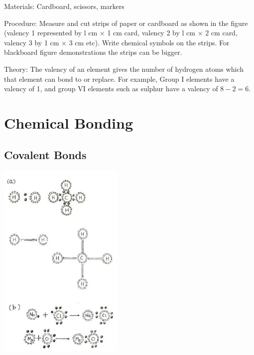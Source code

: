 \begin{multicols}{2}
\begin{description*}
\item[Materials:]{Cardboard, scissors, markers}
\item[Procedure:]{Measure and cut strips of paper or cardboard as shown in the figure (valency 1 represented by
l cm $\times$ 1 cm card, valency 2 by l cm $\times$ 2 cm card,
valency 3 by 1 cm $\times$ 3 cm etc). Write chemical
symbols on the strips. For blackboard figure
demonstrations the strips can be bigger.}
\item[Theory:]{The valency of an element gives the number of
hydrogen atoms which that element can bond to or
replace. For example, Group I elements have a valency of 1, and group VI elements such as sulphur have a valency of $8-2=6$.}
\end{description*}

\vfill
\columnbreak


\section*{Chemical Bonding} 


\subsection{Covalent Bonds}

\begin{center}
\includegraphics[width=0.45\textwidth]{./img/source/covalent-bonds.jpg}
\end{center}


\end{multicols}
